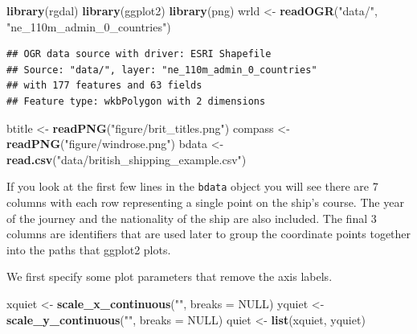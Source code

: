 \documentclass[]{article}
\newenvironment{Shaded}{}{}
\newcommand{\KeywordTok}[1]{\textcolor[rgb]{0.00,0.44,0.13}{\textbf{{#1}}}}
\newcommand{\DataTypeTok}[1]{\textcolor[rgb]{0.56,0.13,0.00}{{#1}}}
\newcommand{\StringTok}[1]{\textcolor[rgb]{0.25,0.44,0.63}{{#1}}}
\newcommand{\OtherTok}[1]{\textcolor[rgb]{0.00,0.44,0.13}{{#1}}}
\newcommand{\NormalTok}[1]{{#1}}
\begin{document}
\begin{Shaded}
\begin{Highlighting}[]
\KeywordTok{library}\NormalTok{(rgdal)}
\KeywordTok{library}\NormalTok{(ggplot2)}
\KeywordTok{library}\NormalTok{(png)}
\NormalTok{wrld <-}\StringTok{ }\KeywordTok{readOGR}\NormalTok{(}\StringTok{"data/"}\NormalTok{, }\StringTok{"ne_110m_admin_0_countries"}\NormalTok{)}
\end{Highlighting}
\end{Shaded}

\begin{verbatim}
## OGR data source with driver: ESRI Shapefile 
## Source: "data/", layer: "ne_110m_admin_0_countries"
## with 177 features and 63 fields
## Feature type: wkbPolygon with 2 dimensions
\end{verbatim}

\begin{Shaded}
\begin{Highlighting}[]
\NormalTok{btitle <-}\StringTok{ }\KeywordTok{readPNG}\NormalTok{(}\StringTok{"figure/brit_titles.png"}\NormalTok{)}
\NormalTok{compass <-}\StringTok{ }\KeywordTok{readPNG}\NormalTok{(}\StringTok{"figure/windrose.png"}\NormalTok{)}
\NormalTok{bdata <-}\StringTok{ }\KeywordTok{read.csv}\NormalTok{(}\StringTok{"data/british_shipping_example.csv"}\NormalTok{)}
\end{Highlighting}
\end{Shaded}

If you look at the first few lines in the \texttt{bdata} object you will
see there are 7 columns with each row representing a single point on the
ship's course. The year of the journey and the nationality of the ship
are also included. The final 3 columns are identifiers that are used
later to group the coordinate points together into the paths that
ggplot2 plots.

We first specify some plot parameters that remove the axis labels.

\begin{Shaded}
\begin{Highlighting}[]
\NormalTok{xquiet <-}\StringTok{ }\KeywordTok{scale_x_continuous}\NormalTok{(}\StringTok{""}\NormalTok{, }\DataTypeTok{breaks =} \OtherTok{NULL}\NormalTok{)}
\NormalTok{yquiet <-}\StringTok{ }\KeywordTok{scale_y_continuous}\NormalTok{(}\StringTok{""}\NormalTok{, }\DataTypeTok{breaks =} \OtherTok{NULL}\NormalTok{)}
\NormalTok{quiet <-}\StringTok{ }\KeywordTok{list}\NormalTok{(xquiet, yquiet)}
\end{Highlighting}
\end{Shaded}
\end{document}
